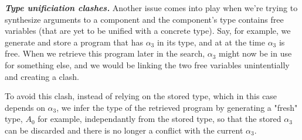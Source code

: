 \documentclass[acmsmall,nonacm]{acmart}
\begin{document}
\vspace{2mm}
\noindent \textbf{\textit{Type unificiation clashes.}} 
Another issue comes into play when we're trying to synthesize 
arguments to a component and the component's type contains 
free variables (that are yet to be unified with a concrete
type). 
Say, for example, we generate and store a program that has $\alpha_3$ in 
its type, and at at the time $\alpha_3$ is 
free. When we retrieve this program later in the search, 
$\alpha_3$ might now be in use for something else, and we would be linking 
the two free variables unintentially and creating a clash. 

To avoid this clash, instead of relying on the stored type, which in this case
depends on $\alpha_3$, we infer the type
of the retrieved program by generating a "fresh" type, $A_0$ for example, 
independantly from the stored type, so that 
the stored $\alpha_3$ can be discarded and there is no longer a conflict 
with the current $\alpha_3$.











    
\end{document}
